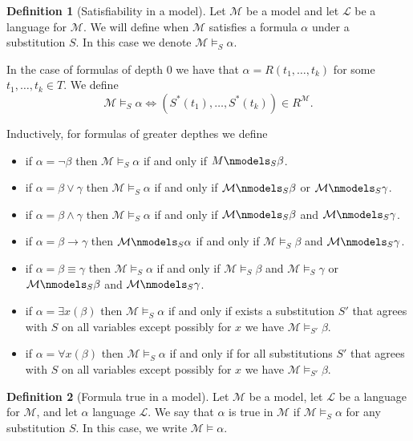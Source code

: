 \documentclass[11pt,a4paper]{article}
\theoremstyle{definition}
\newtheorem{definition}{Definition}[section]
\theoremstyle{plain}
\newcommand{\M}{\mathcal{M}}
\renewcommand{\L}{\mathcal{L}}
\renewcommand{\implies}{\rightarrow}
\begin{document}
  \begin{definition}[Satisfiability in a model]
    Let $\M$ be a model and let $\L$ be a language for $\M$.
    We will define when $\M$ satisfies a formula $\alpha$ under a
    substitution $S$. In this case we denote $\M \models_S \alpha$.

    In the case of formulas of depth $0$ we have that 
    $\alpha = R(t_1,\dots,t_k)$ for some $t_1,\dots,t_k \in T$.
    We define
    \[
      \M \models_S \alpha \iff (S^*(t_1),\dots,S^*(t_k)) \in R^\M.
    \]

    Inductively, for formulas of greater depthes we define
    \begin{itemize}
      \item if $\alpha = \neg \beta$ then $\M \models_S \alpha$ if and only
        if $M \nmodels_S \beta$.
      \item if $\alpha = \beta \lor \gamma$ then $\M \models_S \alpha$ if and 
        only if $\M \nmodels_S \beta$ or $\M \nmodels_S \gamma$.
      \item if $\alpha = \beta \land \gamma$ then $\M \models_S \alpha$ if and 
        only if $\M \nmodels_S \beta$ and $\M \nmodels_S \gamma$.
      \item if $\alpha = \beta \implies \gamma$ then $\M \nmodels_S \alpha$ 
        if and only if $\M \models_S \beta$ and $\M \nmodels_S \gamma$.
      \item if $\alpha = \beta \equiv \gamma$ then $\M \models_S \alpha$ 
        if and only if $\M \models_S \beta$ and $\M \models_S \gamma$ or
        $\M \nmodels_S \beta$ and $\M \nmodels_S \gamma$.
      \item if $\alpha = \exists x(\beta)$ then $\M \models_S \alpha$ if
        and only if exists a substitution $S'$ that agrees with $S$ on all
        variables except possibly for $x$ we have $\M \models_{S'} \beta$.
      \item if $\alpha = \forall x(\beta)$ then $\M \models_S \alpha$ if
        and only if for all substitutions $S'$ that agrees with $S$ on all
        variables except possibly for $x$ we have $\M \models_{S'} \beta$.
    \end{itemize}
  \end{definition}

  \begin{definition}[Formula true in a model]
    Let $\M$ be a model, let $\L$ be a language for $\M$, 
    and let $\alpha$ language $\L$.
    We say that $\alpha$ is true in $\M$ if $\M \models_S \alpha$ for any
    substitution $S$.
    In this case, we write $\M \models \alpha$.
  \end{definition}
\end{document}
